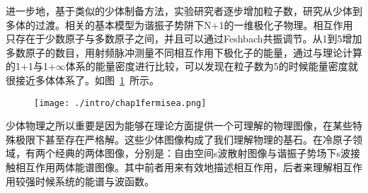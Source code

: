 进一步地，基于类似的少体制备方法，实验研究者逐步增加粒子数，研究从少体到多体的过渡\cite{WenzFermiSeaOnebyOne}。相关的基本模型为谐振子势阱下N+1的一维极化子物理。相互作用只存在于少数原子与多数原子之间，并且可以通过Feshbach共振调节。从1到5增加多数原子的数目，用射频脉冲测量不同相互作用下极化子的能量，通过与理论计算的1+1与1+$\infty$体系的能量密度进行比较，可以发现在粒子数为5的时候能量密度就很接近多体体系了。如图~\ref{fermisea}~所示。
\begin{figure}[!htbp]
    \centering
    \texttt{[image: ./intro/chap1fermisea.png]}
    \label{fermisea}
\end{figure}

少体物理之所以重要是因为能够在理论方面提供一个可理解的物理图像，在某些特殊极限下甚至存在严格解。这些少体图像构成了我们理解物理的基石。在冷原子领域，有两个经典的两体图像，分别是：自由空间s波散射图像与谐振子势场下s波接触相互作用两体能谱图像。其中前者用来有效地描述相互作用，后者来理解相互作用较强时候系统的能谱与波函数。

